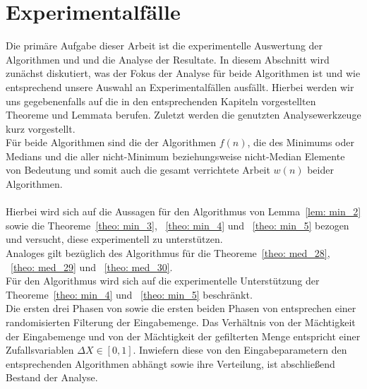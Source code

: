 \section{Experimentalfälle}		%

\noindent
Die primäre Aufgabe dieser Arbeit ist die experimentelle Auswertung der Algorithmen \Rm und \RM und die Analyse der Resultate. In diesem Abschnitt wird zunächst diskutiert, was der Fokus der Analyse für beide Algorithmen ist und wie entsprechend unsere Auswahl an Experimentalfällen ausfällt.  Hierbei werden wir uns gegebenenfalls auf die in den entsprechenden Kapiteln vorgestellten Theoreme und Lemmata berufen. Zuletzt werden die genutzten Analysewerkzeuge kurz vorgestellt.\\[.1cm]

\noindent
Für beide Algorithmen sind die \fg der Algorithmen $f(n)$, die des Minimums \fgm oder Medians \fgM und die aller nicht-Minimum beziehungsweise nicht-Median Elemente von Bedeutung und somit auch die gesamt verrichtete Arbeit $w(n)$ beider Algorithmen.\\\\[.05cm]
Hierbei wird sich auf die Aussagen für den Algorithmus \Rm von Lemma~\ref{lem: min_2} sowie die Theoreme~\ref{theo: min_3}, ~\ref{theo: min_4} und ~\ref{theo: min_5} bezogen und versucht, diese experimentell zu unterstützen.\\
Analoges gilt bezüglich des Algorithmus \RM für die Theoreme~\ref{theo: med_28}, ~\ref{theo: med_29} und ~\ref{theo: med_30}.\\[.05cm]
Für den Algorithmus \RM wird sich auf die experimentelle Unterstützung der Theoreme~\ref{theo: min_4} und ~\ref{theo: min_5} beschränkt.\\[.05cm]
Die ersten drei Phasen von \Rm sowie die ersten beiden Phasen von \RM entsprechen einer randomisierten Filterung der Eingabemenge. Das Verhältnis von der Mächtigkeit der Eingabemenge und von der Mächtigkeit der gefilterten Menge entspricht einer Zufallsvariablen $\Delta X\in[0,1]$. Inwiefern diese von den Eingabeparametern den entsprechenden Algorithmen abhängt sowie ihre Verteilung, ist abschließend Bestand der Analyse.\\[.1cm]

